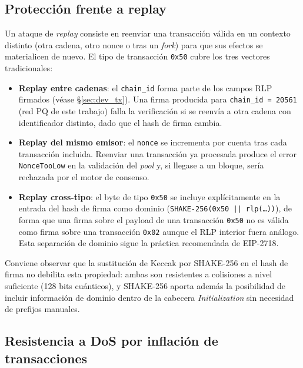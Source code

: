 \subsection{Protección frente a replay}
\label{sec:sec_replay}

Un ataque de \emph{replay} consiste en reenviar una transacción válida en un contexto distinto (otra cadena, otro nonce o tras un \emph{fork}) para que sus efectos se materialicen de nuevo. El tipo de transacción \texttt{0x50} cubre los tres vectores tradicionales:

\begin{itemize}
  \item \textbf{Replay entre cadenas}: el \texttt{chain\_id} forma parte de los campos RLP firmados (véase \S\ref{sec:dev_tx}). Una firma producida para \texttt{chain\_id = 20561} (red PQ de este trabajo) falla la verificación si se reenvía a otra cadena con identificador distinto, dado que el hash de firma cambia.
  
  \item \textbf{Replay del mismo emisor}: el \texttt{nonce} se incrementa por cuenta tras cada transacción incluida. Reenviar una transacción ya procesada produce el error \texttt{NonceTooLow} en la validación del \emph{pool} y, si llegase a un bloque, sería rechazada por el motor de consenso.
  
  \item \textbf{Replay cross-tipo}: el byte de tipo \texttt{0x50} se incluye explícitamente en la entrada del hash de firma como dominio (\texttt{SHAKE-256(0x50 || rlp(\ldots))}), de forma que una firma sobre el payload de una transacción \texttt{0x50} no es válida como firma sobre una transacción \texttt{0x02} aunque el RLP interior fuera análogo. Esta separación de dominio sigue la práctica recomendada de EIP-2718.
\end{itemize}

Conviene observar que la sustitución de Keccak por SHAKE-256 en el hash de firma no debilita esta propiedad: ambas son resistentes a colisiones a nivel suficiente (128 bits cuánticos), y SHAKE-256 aporta además la posibilidad de incluir información de dominio dentro de la cabecera \emph{Initialization} sin necesidad de prefijos manuales.

\subsection{Resistencia a DoS por inflación de transacciones}
\label{sec:sec_dos}

